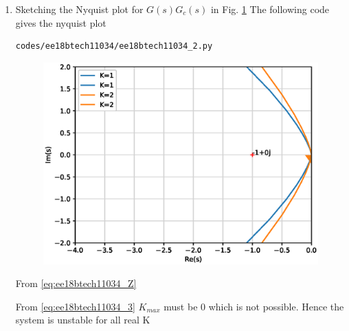 \begin{enumerate}[label=\thesubsection.\arabic*.,ref=\thesubsection.\theenumi]
\item Sketching the Nyquist plot for $G(s)G_c(s)$ in Fig. \ref{fig:ee18btech11034_2}
The following code gives the nyquist plot
\begin{lstlisting}
codes/ee18btech11034/ee18btech11034_2.py
\end{lstlisting}
\begin{figure}[!h]
\centering
\includegraphics[width=\columnwidth]{./figs/ee18btech11034/ee18btech11034_2.eps}
\caption{}
\label{fig:ee18btech11034_2}
\end{figure}
From \eqref{eq:ee18btech11034_Z}

\begin{table}[!ht]
\centering

\caption{}
\label{table:ee18btech11034_table2}
\end{table}
From \eqref{eq:ee18btech11034_3} $K_{max}$ must be 0 which is not possible.
Hence the system is unstable for all real K
\end{enumerate}
